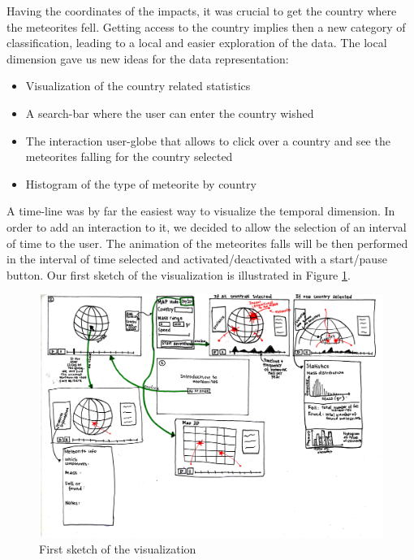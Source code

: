 \documentclass[10pt,conference,compsocconf]{IEEEtran}
\begin{document}
Having the coordinates of the impacts, it was crucial to get the country where the meteorites fell. Getting access to the country implies then a new category of classification, leading to a local and easier exploration of the data. The local dimension gave us new ideas for the data representation: 

\begin{itemize}
\item Visualization of the country related statistics
\item A search-bar where the user can enter the country wished
\item The interaction user-globe that allows to click over a country and see the meteorites falling for the country selected 
\item Histogram of the type of meteorite by country
\end{itemize}

A time-line was by far the easiest way to visualize the temporal dimension. In order to add an interaction to it, we decided to allow the selection of an interval of time to the user. The animation of the meteorites falls will be then performed in the interval of time selected and activated/deactivated with a start/pause button. 
Our first sketch of the visualization is illustrated in Figure \ref{fig:sketch1}.

\begin{figure}[]
  \centering
  \includegraphics[angle=-90,width=\columnwidth]{images/sketch1.jpg}
  \vspace{-3mm}
  \caption{First sketch of the visualization}
  \label{fig:sketch1}
\end{figure}
\end{document}
